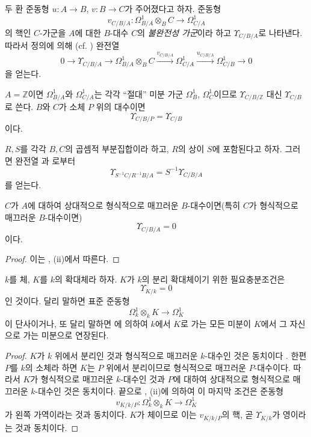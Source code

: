 \begin{definition}[20.6.1]
\label{0.20.6.1-ko}
두 환 준동형 $u:A\to B$, $v:B\to C$가 주어졌다고 하자.
준동형
\[
  v_{C/B/A}:\Omega^1_{B/A}\otimes_B C\to\Omega^1_{C/A}
\]
의 핵인 $C$-가군을 $A$에 대한 $B$-대수 $C$의
\emph{불완전성 가군}이라 하고 $\Upsilon_{C/B/A}$로 나타낸다.
따라서 정의에 의해 (cf. ) 완전열
\begin{equation}
\tag{20.6.1.1}
\label{0.20.6.1.1-ko}
  0\longrightarrow\Upsilon_{C/B/A}\longrightarrow
  \Omega^1_{B/A}\otimes_B C\xrightarrow{v_{C/B/A}}
  \Omega^1_{C/A}\xrightarrow{u_{C/B/A}}\Omega^1_{C/B}
  \longrightarrow0
\end{equation}
을 얻는다.
\end{definition}

$A=\mathbb Z$이면 $\Omega^1_{B/A}$와 $\Omega^1_{C/A}$는 각각
“절대” 미분 가군 $\Omega^1_B$, $\Omega^1_C$이므로
$\Upsilon_{C/B/\mathbb Z}$ 대신 $\Upsilon_{C/B}$로 쓴다.
$B$와 $C$가 소체 $P$ 위의 대수이면
\[
  \Upsilon_{C/B/P}=\Upsilon_{C/B}
\]
이다.

$R,S$를 각각 $B,C$의 곱셈적 부분집합이라 하고, $R$의 상이
$S$에 포함된다고 하자. 그러면 완전열
과 로부터
\begin{equation}
\tag{20.6.1.2}
\label{0.20.6.1.2-ko}
  \Upsilon_{S^{-1}C/R^{-1}B/A}
  =S^{-1}\Upsilon_{C/B/A}
\end{equation}
를 얻는다.

\begin{proposition}[20.6.2]
\label{0.20.6.2-ko}
$C$가 $A$에 대하여 상대적으로 형식적으로 매끄러운
$B$-대수이면(특히 $C$가 형식적으로 매끄러운 $B$-대수이면)
\[
  \Upsilon_{C/B/A}=0
\]
이다.
\end{proposition}

\begin{proof}
이는 , (ii)에서 따른다.
\end{proof}

\begin{proposition}[20.6.3]
\label{0.20.6.3-ko}
$k$를 체, $K$를 $k$의 확대체라 하자. $K$가 $k$의 분리
확대체이기 위한 필요충분조건은
\[
  \Upsilon_{K/k}=0
\]
인 것이다. 달리 말하면 표준 준동형
\[
  \Omega^1_k\otimes_k K\to\Omega^1_K
\]
이 단사이거나, 또 달리 말하면 에 의하여
$k$에서 $K$로 가는 모든 미분이 $K$에서 그 자신으로 가는
미분으로 연장된다.
\end{proposition}

\begin{proof}
$K$가 $k$ 위에서 분리인 것과 형식적으로 매끄러운
$k$-대수인 것은 동치이다 . 한편 $P$를
$k$의 소체라 하면 $K$는 $P$ 위에서 분리이므로 형식적으로
매끄러운 $P$-대수이다. 따라서 $K$가 형식적으로 매끄러운
$k$-대수인 것과 $P$에 대하여 상대적으로 형식적으로 매끄러운
$k$-대수인 것은 동치이다. 끝으로 , (ii)에
의하여 이 마지막 조건은 준동형
\[
  v_{K/k/P}:\Omega^1_k\otimes_k K\to\Omega^1_K
\]
가 왼쪽 가역이라는 것과 동치이다. $K$가 체이므로 이는
$v_{K/k/P}$의 핵, 곧 $\Upsilon_{K/k}$가 영이라는 것과 동치이다.
\end{proof}

